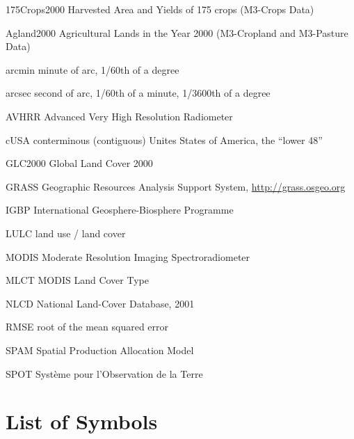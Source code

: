 \documentclass[draftthesis]{neiuthesis}
\begin{document}
\begin{symbollist*}
\item[175Crops2000] Harvested Area and Yields of 175 crops (M3-Crops
  Data) \citep{Monfreda2008}
\item[Agland2000] Agricultural Lands in the Year 2000 (M3-Cropland and
  M3-Pasture Data) \citep{Ramankutty2008}
\item[arcmin] minute of arc, 1/60th of a degree
\item[arcsec] second of arc, 1/60th of a minute, 1/3600th of a degree
\item[AVHRR] Advanced Very High Resolution Radiometer
\item[cUSA] conterminous (contiguous) Unites States of America, the ``lower 48''
\item[GLC2000] Global Land Cover 2000 \citep{EC2003}
\item[GRASS] Geographic Resources Analysis Support System, \url{http://grass.osgeo.org}
\item[IGBP] International Geosphere-Biosphere Programme
\item[LULC] land use / land cover
\item[MODIS] Moderate Resolution Imaging Spectroradiometer
\item[MLCT] MODIS Land Cover Type \citep{MLCT}
\item[NLCD] National Land-Cover Database, 2001 \citep{Homer2004}
\item[RMSE] root of the mean squared error
\item[SPAM] Spatial Production Allocation Model
\item[SPOT] Syst\`eme pour l'Observation de la Terre

\end{symbollist*}

\chapter{List of Symbols}
\end{document}
